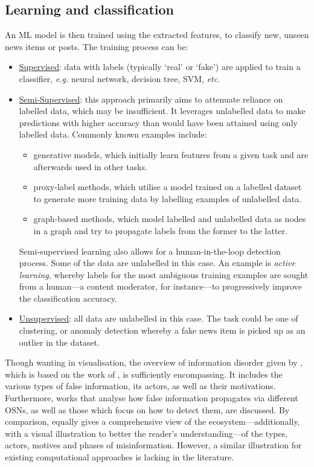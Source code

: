 \subsection{Learning and classification}
\label{ssec:2-learning-and-classification}

An \ac{ML} model is then trained using the extracted features, to classify new, unseen news items or posts. The training process can be:
\begin{itemize}
  \item \underline{Supervised}: data with labels (typically `real' or `fake') are applied to train a classifier, \emph{e.g.} neural network, decision tree, \ac{SVM}, \emph{etc.}
  \item \underline{Semi-Supervised}: this approach primarily aims to attenuate reliance on labelled data, which may be insufficient. It leverages unlabelled data to make predictions with higher accuracy than would have been attained using only labelled data. Commonly known examples include:
  \begin{itemize}
    \item generative models, which initially learn features from a given task and are afterwards used in other tasks.
    \item proxy-label methods, which utilise a model trained on a labelled dataset to generate more training data by labelling examples of unlabelled data.
    \item graph-based methods, which model labelled and unlabelled data as nodes in a graph and try to propagate labels from the former to the latter.
  \end{itemize}
  Semi-supervised learning also allows for a human-in-the-loop detection process. Some of the data are unlabelled in this case. An example is \emph{active learning}, whereby labels for the most ambiguous training examples are sought from a human—a content moderator, for instance—to progressively improve the classification accuracy.
  \item \underline{Unsupervised}: all data are unlabelled in this case. The task could be one of clustering, or anomaly detection whereby a fake news item is picked up as an outlier in the dataset.
\end{itemize}

Though wanting in visualisation, the overview of information disorder given by , which is based on the work of , is sufficiently encompassing. It includes the various types of false information, its actors, as well as their motivations. Furthermore, works that analyse how false information propagates via different \acp{OSN}, as well as those which focus on how to detect them, are discussed. By comparison,  equally gives a comprehensive view of the ecosystem—additionally, with a visual illustration to better the reader’s understanding—of the types, actors, motives and phases of misinformation. However, a similar illustration for existing computational approaches is lacking in the literature.

